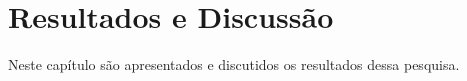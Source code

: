 \chapter{Resultados e Discussão}

Neste capítulo são apresentados e discutidos os resultados dessa pesquisa. 







